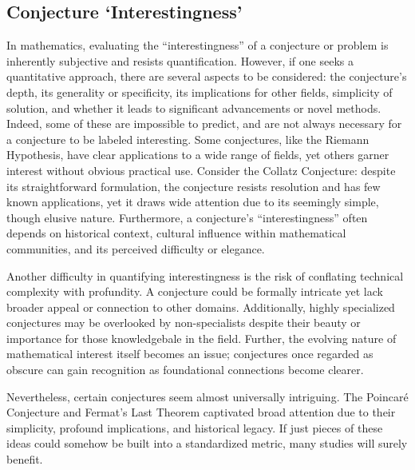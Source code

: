 \documentclass{article}
\begin{document}
\subsection{Conjecture `Interestingness'}\label{interestingness}
In mathematics, evaluating the ``interestingness'' of a conjecture or problem is inherently subjective and resists quantification. However, if one seeks a quantitative approach, there are several aspects to be considered: the conjecture's depth, its generality or specificity, its implications for other fields, simplicity of solution, and whether it leads to significant advancements or novel methods. Indeed, some of these are impossible to predict, and are not always necessary for a conjecture to be labeled interesting. Some conjectures, like the Riemann Hypothesis, have clear applications to a wide range of fields, yet others garner interest without obvious practical use. Consider the Collatz Conjecture: despite its straightforward formulation, the conjecture resists resolution and has few known applications, yet it draws wide attention due to its seemingly simple, though elusive nature. Furthermore, a conjecture’s ``interestingness'' often depends on historical context, cultural influence within mathematical communities, and its perceived difficulty or elegance.

Another difficulty in quantifying interestingness is the risk of conflating technical complexity with profundity. A conjecture could be formally intricate yet lack broader appeal or connection to other domains. Additionally, highly specialized conjectures may be overlooked by non-specialists despite their beauty or importance for those knowledgebale in the field. Further, the evolving nature of mathematical interest itself becomes an issue; conjectures once regarded as obscure can gain recognition as foundational connections become clearer.

Nevertheless, certain conjectures seem almost universally intriguing. The Poincaré Conjecture and Fermat's Last Theorem captivated broad attention due to their simplicity, profound implications, and historical legacy. If just pieces of these ideas could somehow be built into a standardized metric, many studies will surely benefit. 
\end{document}
